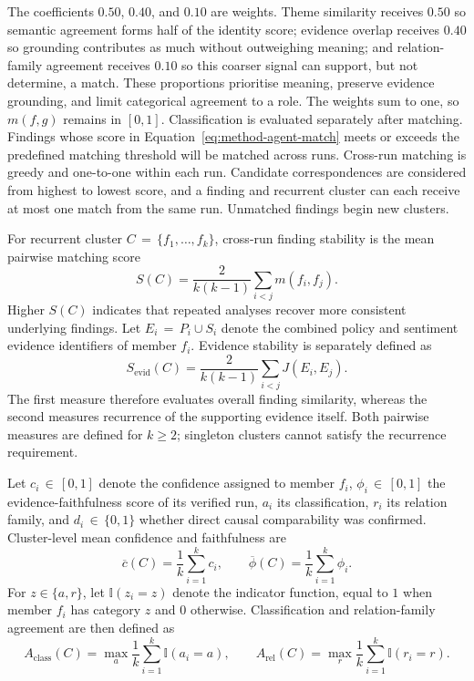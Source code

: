 The coefficients $0.50$, $0.40$, and $0.10$ are weights. Theme similarity receives
$0.50$ so semantic agreement forms half of the identity score; evidence overlap
receives $0.40$ so grounding contributes as much without outweighing meaning; and
relation-family agreement receives $0.10$ so this coarser signal can support, but not
determine, a match. These proportions prioritise meaning, preserve evidence
grounding, and limit categorical agreement to a role. The weights sum to one, so
$m(f,g)$ remains in $[0,1]$. Classification is evaluated separately after matching.
Findings whose score in Equation~\ref{eq:method-agent-match} meets or exceeds the
predefined matching threshold will be matched across runs. Cross-run matching is
greedy and one-to-one within each run. Candidate correspondences are considered from
highest to lowest score, and a finding and recurrent cluster can each receive at most
one match from the same run. Unmatched findings begin new clusters.

For recurrent cluster
$C\,{=}\,\{f_1,\ldots,f_k\}$, cross-run finding stability is the mean pairwise matching
score
\begin{equation}
S(C)
=
\frac{2}{k(k-1)}
\sum_{i<j}m(f_i,f_j).
\label{eq:method-agent-stability}
\end{equation}
Higher $S(C)$ indicates that repeated analyses recover more consistent underlying
findings. Let $E_i\,{=}\,P_i\cup S_i$ denote the combined policy and sentiment
evidence identifiers of member $f_i$. Evidence stability is separately defined as
\begin{equation}
S_{\mathrm{evid}}(C)
=
\frac{2}{k(k-1)}
\sum_{i<j}J(E_i,E_j).
\label{eq:method-agent-evidence-stability}
\end{equation}
The first measure therefore evaluates overall finding similarity, whereas the second
measures recurrence of the supporting evidence itself. Both pairwise measures are
defined for $k\geq2$; singleton clusters cannot satisfy the recurrence requirement.

Let $c_i\,{\in}\,[0,1]$ denote the confidence assigned to member $f_i$,
$\phi_i\,{\in}\,[0,1]$ the evidence-faithfulness score of its verified run, $a_i$ its
classification, $r_i$ its relation family, and $d_i\,{\in}\,\{0,1\}$ whether direct
causal comparability was confirmed. Cluster-level mean confidence and faithfulness
are
\begin{equation}
\overline{c}(C)
=
\frac{1}{k}\sum_{i=1}^{k}c_i,
\qquad
\overline{\phi}(C)
=
\frac{1}{k}\sum_{i=1}^{k}\phi_i.
\label{eq:method-agent-cluster-means}
\end{equation}
For $z\in\{a,r\}$, let $\mathbb{I}(z_i=z)$ denote the indicator function, equal to
$1$ when member $f_i$ has category $z$ and $0$ otherwise. Classification and
relation-family agreement are then defined as
\begin{equation}
A_{\mathrm{class}}(C)
=
\max_{a}
\frac{1}{k}
\sum_{i=1}^{k}\mathbb{I}(a_i=a),
\qquad
A_{\mathrm{rel}}(C)
=
\max_{r}
\frac{1}{k}
\sum_{i=1}^{k}\mathbb{I}(r_i=r).
\label{eq:method-agent-agreement}
\end{equation}

